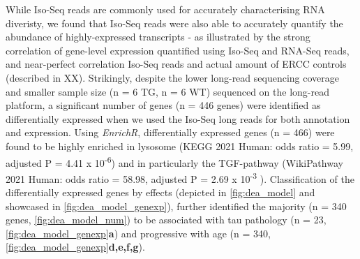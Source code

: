 While Iso-Seq reads are commonly used for accurately characterising RNA diveristy, we found that Iso-Seq reads were also able to accurately quantify the abundance of highly-expressed transcripts - as illustrated by the strong correlation of gene-level expression quantified using Iso-Seq and RNA-Seq reads, and near-perfect correlation Iso-Seq reads and actual amount of ERCC controls (described in XX). Strikingly, despite the lower long-read sequencing coverage and smaller sample size (n = 6 TG, n = 6 WT) sequenced on the long-read platform, a significant number of genes (n = 446 genes) were identified as differentially expressed when we used the Iso-Seq long reads for both annotation and expression. Using \textit{EnrichR}, differentially expressed genes (n = 466) were found to be highly enriched in lysosome (KEGG 2021 Human: odds ratio = 5.99, adjusted P = 4.41 x 10\textsuperscript{-6}) and in particularly the TGF-\textbeta pathway (WikiPathway 2021 Human: odds ratio = 58.98, adjusted P = 2.69 x 10\textsuperscript{-3} ). Classification of the differentially expressed genes by effects (depicted in \cref{fig:dea_model} and showcased in \cref{fig:dea_model_genexp}), further identified the majority (n = 340 genes, \cref{fig:dea_model_num}) to be associated with tau pathology (n = 23, \cref{fig:dea_model_genexp}\textbf{a}) and progressive with age (n = 340, \cref{fig:dea_model_genexp}\textbf{d,e,f,g}).       
 
